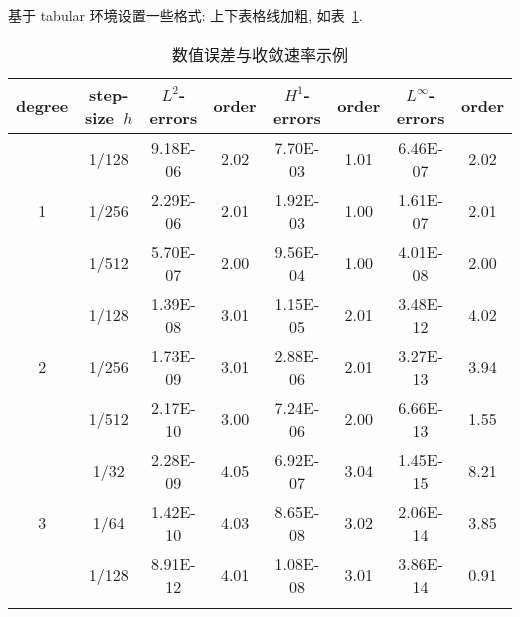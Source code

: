 \documentclass[UTF8,openany,twoside,12pt]{ctexbook}
\theoremstyle{plain}
\begin{document}
\clearpage
基于 tabular 环境设置一些格式: 上下表格线加粗, 如表~\ref{tab:error1}.
\begin{table}[!htp]
\centering
\caption{数值误差与收敛速率示例}
\label{tab:error1}
\begin{tabular}{c|c|cc|cc|cc}
\Xhline{2\arrayrulewidth}
degree & step-size~$h$ & $L^2$-errors & order & $H^1$-errors & order & $L^\infty$-errors & order \\
\hline
  & 1/128 & 9.18E-06 & 2.02 & 7.70E-03 & 1.01  & 6.46E-07 & 2.02 \\
1 & 1/256 & 2.29E-06 & 2.01 & 1.92E-03 & 1.00  & 1.61E-07 & 2.01 \\
  & 1/512 & 5.70E-07 & 2.00 & 9.56E-04 & 1.00  & 4.01E-08 & 2.00 \\
\hline
  & 1/128 & 1.39E-08 & 3.01 & 1.15E-05 & 2.01  & 3.48E-12 & 4.02 \\
2 & 1/256 & 1.73E-09 & 3.01 & 2.88E-06 & 2.01  & 3.27E-13 & 3.94 \\
  & 1/512 & 2.17E-10 & 3.00 & 7.24E-06 & 2.00  & 6.66E-13 & 1.55 \\
\hline
  & 1/32  & 2.28E-09 & 4.05 & 6.92E-07 & 3.04  & 1.45E-15 & 8.21 \\
3 & 1/64  & 1.42E-10 & 4.03 & 8.65E-08 & 3.02  & 2.06E-14 & 3.85 \\
  & 1/128 & 8.91E-12 & 4.01 & 1.08E-08 & 3.01  & 3.86E-14 & 0.91 \\
\Xhline{2\arrayrulewidth}
\end{tabular}
\end{table}
\end{document}
